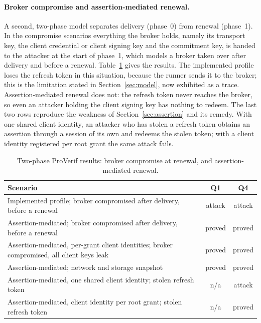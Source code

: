\documentclass[11pt]{article}
\begin{document}
\paragraph{Broker compromise and assertion-mediated renewal.} A second, two-phase model separates delivery (phase~0) from renewal (phase~1). In the compromise scenarios everything the broker holds, namely its transport key, the client credential or client signing key and the commitment key, is handed to the attacker at the start of phase~1, which models a broker taken over after delivery and before a renewal. Table~\ref{tab:pv2} gives the results. The implemented profile loses the refresh token in this situation, because the runner sends it to the broker; this is the limitation stated in Section~\ref{sec:model}, now exhibited as a trace. Assertion-mediated renewal does not: the refresh token never reaches the broker, so even an attacker holding the client signing key has nothing to redeem. The last two rows reproduce the weakness of Section~\ref{sec:assertion} and its remedy. With one shared client identity, an attacker who has stolen a refresh token obtains an assertion through a session of its own and redeems the stolen token; with a client identity registered per root grant the same attack fails.

\begin{table}[t]
\centering
\small
\begin{tabular}{@{}p{}cc@{}}
\toprule
Scenario & Q1 & Q4 \\
\midrule
Implemented profile; broker compromised after delivery, before a renewal & attack & attack \\
Assertion-mediated; broker compromised after delivery, before a renewal & proved & proved \\
Assertion-mediated, per-grant client identities; broker compromised, all client keys leak & proved & proved \\
Assertion-mediated; network and storage snapshot & proved & proved \\
\midrule
Assertion-mediated, one shared client identity; stolen refresh token & n/a & attack \\
Assertion-mediated, client identity per root grant; stolen refresh token & n/a & proved \\
\bottomrule
\end{tabular}
\caption{Two-phase ProVerif results: broker compromise at renewal, and assertion-mediated renewal.}
\label{tab:pv2}
\end{table}
\end{document}
